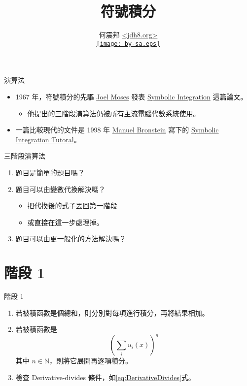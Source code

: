 \documentclass{beamer}
\title{符號積分}
\author[何震邦]{何震邦 \href{http://jdh8.org/}{\textless jdh8.org\textgreater}\\
    \href{http://creativecommons.org/licenses/by-sa/3.0/tw/deed.zh\textunderscore TW}{\texttt{[image: by-sa.eps]}}}
\newcommand{\N}{\mathbb N}
\theoremstyle{remark}
\begin{document}
\begin{CJK}{UTF8}{bsmi}
\maketitle

\begin{frame}{演算法}
  \begin{itemize}
    \item 1967 年，符號積分的先驅 \href{http://en.wikipedia.org/wiki/Joel\textunderscore Moses}{Joel Moses} 發表
      \href{http://www.softwarepreservation.org/projects/LISP/MIT/MIT-LCS-TR-047-corrected-ocr.pdf}{Symbolic Integration}
      這篇論文。
      \begin{itemize}
	\item 他提出的三階段演算法仍被所有主流電腦代數系統使用。
      \end{itemize}
    \item 一篇比較現代的文件是 1998 年
      \href{http://www-sop.inria.fr/cafe/Manuel.Bronstein/bronstein-eng.html}{Manuel Bronstein} 寫下的
      \href{http://www-sop.inria.fr/cafe/Manuel.Bronstein/publications/issac98.pdf}{Symbolic Integration Tutoral}。
  \end{itemize}
\end{frame}

\begin{frame}{三階段演算法}
  \begin{enumerate}
    \item 題目是簡單的題目嗎？
    \item 題目可以由變數代換解決嗎？
      \begin{itemize}
	\item 把代換後的式子丟回第一階段
	\item 或直接在這一步處理掉。
      \end{itemize}
    \item 題目可以由更一般化的方法解決嗎？
  \end{enumerate}
\end{frame}

\section{階段 1}
\begin{frame}{階段 1}
  \begin{enumerate}
    \item 若被積函數是個總和，則分別對每項進行積分，再將結果相加。
    \item 若被積函數是
      \[\left( \sum_i u_i(x) \right)^n\]
      其中 $n \in \N$，則將它展開再逐項積分。
    \item 檢查 Derivative-divides 條件，如\eqref{eq:DerivativeDivides}式。
  \end{enumerate}
\end{frame}


\end{CJK}
\end{document}

